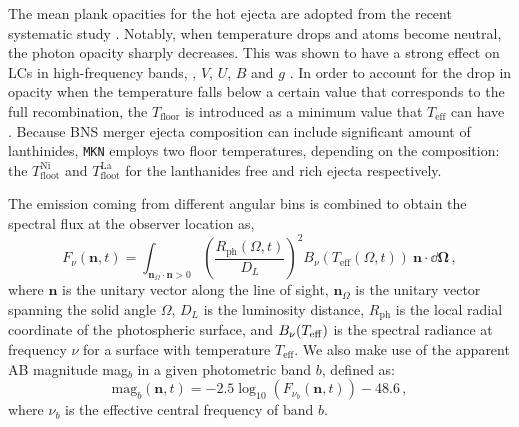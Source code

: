 %
The mean plank opacities for the hot ejecta are adopted from the recent systematic study 
\citep{Tanaka:2019iqp}.
Notably, when temperature drops and atoms become neutral, the photon opacity sharply decreases. 
This was shown to have a strong effect on \acp{LC} in high-frequency bands, 
\eg, $V$, $U$, $B$ and $g$ \citep{Villar:2017oya}. In order to account 
for the drop in opacity when the temperature falls below a certain value that 
corresponds to the full 
recombination, the $T_{\text{floor}}$ is introduced  
as a minimum value that $T_{\text{eff}}$ can have \citep{Kasen:2017sxr,Kasen:2018drm}. 
Because \ac{BNS} merger ejecta composition can include significant amount of lanthinides, 
\texttt{MKN} employs two floor temperatures, 
depending on the composition: the $T_{\text{floot}}^{\text{Ni}}$ and 
$T_{\text{floot}}^{\text{La}}$ for the lanthanides free and rich ejecta respectively.



The emission coming from different angular bins is combined to obtain the 
spectral flux at the observer location as, 
%
\begin{equation}
\label{eq:spectral_flux}
F_{\nu}(\mathbf{n},t) = \int_{\mathbf{n}_{\Omega} \cdot \mathbf{n}> 0} 
\left( \frac{R_{\text{ph}}(\Omega,t)}{D_L} \right)^2  B_{\nu}(T_{\text{eff}}(\Omega,t))~\mathbf{n} \cdot  \dd\boldsymbol{\Omega}\, , 
\end{equation}
%
where $\mathbf{n}$ is the unitary vector along the line of sight, 
$\mathbf{n}_{\Omega}$ is the unitary vector spanning the solid angle 
$\Omega$, $D_L$ is the luminosity distance, $R_{\text{ph}}$ is the local 
radial coordinate of the photospheric surface, and $B_{\nu}(T_{\rm eff})$ 
is the spectral radiance at frequency $\nu$ for a surface with temperature $T_{\text{eff}}$. 
%
We also make use of the apparent AB magnitude mag$_b$ in a given photometric band $b$, defined as:
%
\begin{equation}
\label{eq:mag}
\text{mag}_b(\mathbf{n},t) = -2.5 \log_{10}\left( F_{\nu_b}(\mathbf{n},t) \right)-48.6\,,
\end{equation}
where $\nu_b$ is the effective central frequency of band $b$.


